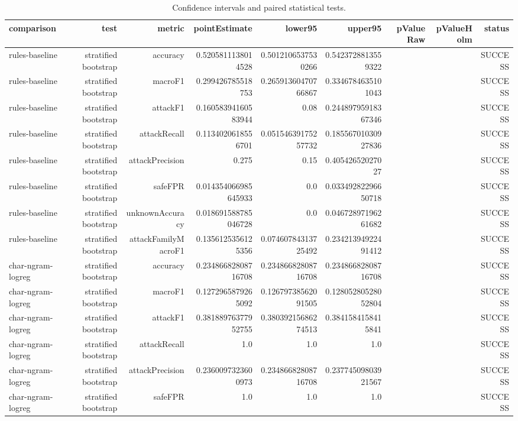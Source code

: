 \begin{table}[t]
\centering
\caption{Confidence intervals and paired statistical tests.}
\begin{tabular}{lrrrrrrrr}
\toprule
comparison & test & metric & pointEstimate & lower95 & upper95 & pValueRaw & pValueHolm & status \\
\midrule
rules-baseline & stratified bootstrap & accuracy & 0.5205811138014528 & 0.5012106537530266 & 0.5423728813559322 &  &  & SUCCESS \\
rules-baseline & stratified bootstrap & macroF1 & 0.299426785518753 & 0.26591360470766867 & 0.3346784635101043 &  &  & SUCCESS \\
rules-baseline & stratified bootstrap & attackF1 & 0.16058394160583944 & 0.08 & 0.24489795918367346 &  &  & SUCCESS \\
rules-baseline & stratified bootstrap & attackRecall & 0.1134020618556701 & 0.05154639175257732 & 0.18556701030927836 &  &  & SUCCESS \\
rules-baseline & stratified bootstrap & attackPrecision & 0.275 & 0.15 & 0.40542652027027 &  &  & SUCCESS \\
rules-baseline & stratified bootstrap & safeFPR & 0.014354066985645933 & 0.0 & 0.03349282296650718 &  &  & SUCCESS \\
rules-baseline & stratified bootstrap & unknownAccuracy & 0.018691588785046728 & 0.0 & 0.04672897196261682 &  &  & SUCCESS \\
rules-baseline & stratified bootstrap & attackFamilyMacroF1 & 0.1356125356125356 & 0.07460784313725492 & 0.23421394922491412 &  &  & SUCCESS \\
char-ngram-logreg & stratified bootstrap & accuracy & 0.23486682808716708 & 0.23486682808716708 & 0.23486682808716708 &  &  & SUCCESS \\
char-ngram-logreg & stratified bootstrap & macroF1 & 0.1272965879265092 & 0.12679738562091505 & 0.12805280528052804 &  &  & SUCCESS \\
char-ngram-logreg & stratified bootstrap & attackF1 & 0.38188976377952755 & 0.38039215686274513 & 0.3841584158415841 &  &  & SUCCESS \\
char-ngram-logreg & stratified bootstrap & attackRecall & 1.0 & 1.0 & 1.0 &  &  & SUCCESS \\
char-ngram-logreg & stratified bootstrap & attackPrecision & 0.2360097323600973 & 0.23486682808716708 & 0.23774509803921567 &  &  & SUCCESS \\
char-ngram-logreg & stratified bootstrap & safeFPR & 1.0 & 1.0 & 1.0 &  &  & SUCCESS \\

\end{tabular}
\end{table}
